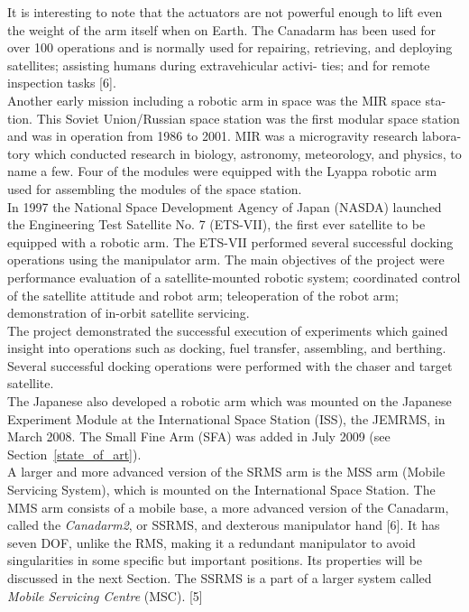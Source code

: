 \documentclass[a4paper,12pt,oneside]{report}
\begin{document}
It is interesting to note that the actuators are not powerful enough to lift even the weight of the arm itself when on Earth. The Canadarm has been used for over 100 operations and is normally used for repairing, retrieving, and deploying satellites; assisting humans during extravehicular activi- ties; and for remote inspection tasks [6].\\
Another early mission including a robotic arm in space was the MIR space sta- tion. This Soviet Union/Russian space station was the first modular space station and was in operation from 1986 to 2001. MIR was a microgravity research labora- tory which conducted research in biology, astronomy, meteorology, and physics, to name a few. Four of the modules were equipped with the Lyappa robotic arm used for assembling the modules of the space station.\\
In 1997 the National Space Development Agency of Japan (NASDA) launched the Engineering Test Satellite No. 7 (ETS-VII), the first ever satellite to be equipped with a robotic arm. The ETS-VII performed several successful docking operations using the manipulator arm. The main objectives of the project were performance evaluation of a satellite-mounted robotic system; coordinated control of the satellite attitude and robot arm; teleoperation of the robot arm; demonstration of in-orbit satellite servicing.\\
The project demonstrated the successful execution of experiments which gained insight into operations such as docking, fuel transfer, assembling, and berthing. Several successful docking operations were performed with the chaser and target satellite.\\
The Japanese also developed a robotic arm which was mounted on the Japanese Experiment Module at the International Space Station (ISS), the JEMRMS, in March 2008. The Small Fine Arm (SFA) was added in July 2009 (see Section~\ref{state_of_art}).\\
A larger and more advanced version of the SRMS arm is the MSS arm (Mobile Servicing System), which is mounted on the International Space Station. The MMS arm consists of a mobile base, a more advanced version of the Canadarm, called the \textit{Canadarm2}, or SSRMS, and dexterous manipulator hand [6]. It has seven DOF, unlike the RMS, making it a redundant manipulator to avoid singularities in some specific but important positions. Its properties will be discussed in the next Section. The SSRMS is a part of a larger system called \textit{Mobile Servicing Centre} (MSC). [5]\\
\end{document}
